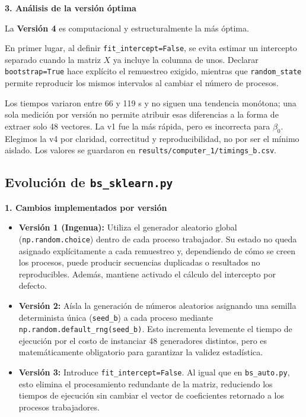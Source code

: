 \documentclass[12pt, letterpaper]{article}
\begin{document}
\textbf{3. Análisis de la versión óptima}

La \textbf{Versión 4} es computacional y estructuralmente la más óptima. 

En primer lugar, al definir \texttt{fit\_intercept=False}, se evita estimar un intercepto separado cuando la matriz $X$ ya incluye la columna de unos. Declarar \texttt{bootstrap=True} hace explícito el remuestreo exigido, mientras que \texttt{random\_state} permite reproducir los mismos intervalos al cambiar el número de procesos.

Los tiempos variaron entre 66 y 119 s y no siguen una tendencia monótona; una
sola medición por versión no permite atribuir esas diferencias a la forma de
extraer solo 48 vectores. La v1 fue la más rápida, pero es incorrecta para
$\beta_0$. Elegimos la v4 por claridad, correctitud y reproducibilidad, no por
ser el mínimo aislado. Los valores se guardaron en
\texttt{results/computer\_1/timings\_b.csv}.

\subsection*{Evolución de \texttt{bs\_sklearn.py}}

\textbf{1. Cambios implementados por versión}
\begin{itemize}
    \item \textbf{Versión 1 (Ingenua):} Utiliza el generador aleatorio global (\texttt{np.random.choice}) dentro de cada proceso trabajador. Su estado no queda asignado explícitamente a cada remuestreo y, dependiendo de cómo se creen los procesos, puede producir secuencias duplicadas o resultados no reproducibles. Además, mantiene activado el cálculo del intercepto por defecto.
    \item \textbf{Versión 2:} Aísla la generación de números aleatorios asignando una semilla determinista única (\texttt{seed\_b}) a cada proceso mediante \texttt{np.random.default\_rng(seed\_b)}. Esto incrementa levemente el tiempo de ejecución por el costo de instanciar 48 generadores distintos, pero es matemáticamente obligatorio para garantizar la validez estadística.
    \item \textbf{Versión 3:} Introduce \texttt{fit\_intercept=False}. Al igual que en \texttt{bs\_auto.py}, esto elimina el procesamiento redundante de la matriz, reduciendo los tiempos de ejecución sin cambiar el vector de coeficientes retornado a los procesos trabajadores.
\end{itemize}
\end{document}
